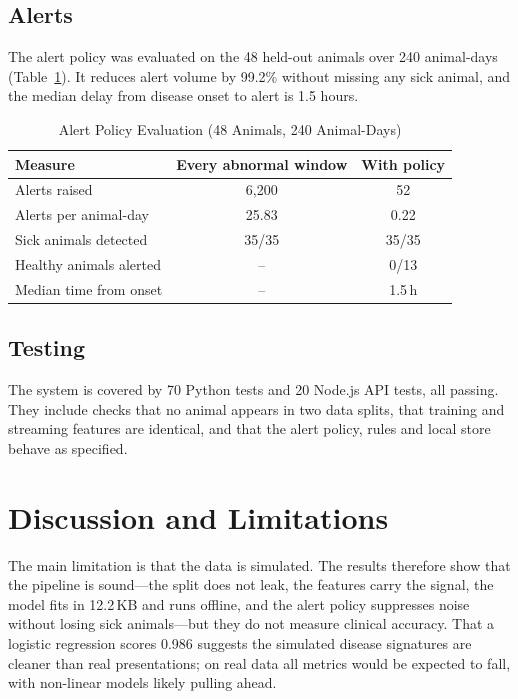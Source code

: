 \documentclass[conference]{IEEEtran}
\begin{document}
\subsection{Alerts}
The alert policy was evaluated on the 48 held-out animals over 240 animal-days
(Table~\ref{tab:alerts}). It reduces alert volume by 99.2\% without missing any
sick animal, and the median delay from disease onset to alert is 1.5 hours.

\begin{table}[t]
\caption{Alert Policy Evaluation (48 Animals, 240 Animal-Days)}
\label{tab:alerts}
\centering
\footnotesize
\begin{tabular}{@{}lcc@{}}
\toprule
\textbf{Measure} & \textbf{Every abnormal window} & \textbf{With policy} \\
\midrule
Alerts raised & 6{,}200 & 52 \\
Alerts per animal-day & 25.83 & 0.22 \\
Sick animals detected & 35/35 & 35/35 \\
Healthy animals alerted & -- & 0/13 \\
Median time from onset & -- & 1.5\,h \\
\bottomrule
\end{tabular}
\end{table}

\subsection{Testing}
The system is covered by 70 Python tests and 20 Node.js API tests, all passing.
They include checks that no animal appears in two data splits, that training
and streaming features are identical, and that the alert policy, rules and
local store behave as specified.

\section{Discussion and Limitations}
The main limitation is that the data is simulated. The results therefore show
that the pipeline is sound---the split does not leak, the features carry the
signal, the model fits in 12.2\,KB and runs offline, and the alert policy
suppresses noise without losing sick animals---but they do not measure clinical
accuracy. That a logistic regression scores 0.986 suggests the simulated disease
signatures are cleaner than real presentations; on real data all metrics would
be expected to fall, with non-linear models likely pulling ahead.
\end{document}
